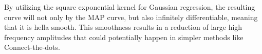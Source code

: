 By utilizing the square exponential kernel for Gaussian regression, the resulting curve will not only by the MAP curve, but also infinitely differentiable, meaning that it is hella smooth.  This smoothness results in a reduction of large high frequency amplitudes that could potentially happen in simpler methods like Connect-the-dots.

